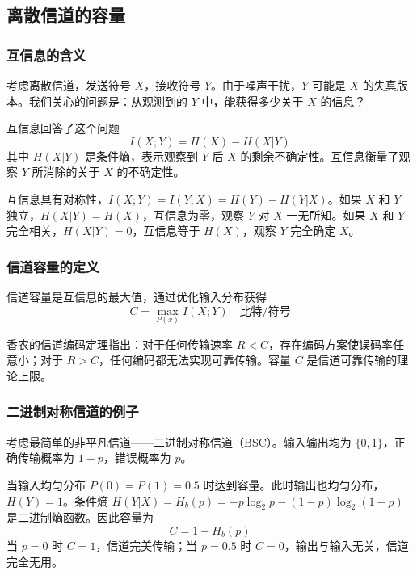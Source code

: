 \subsection{离散信道的容量}

\subsubsection{互信息的含义}

考虑离散信道，发送符号 $X$，接收符号 $Y$。由于噪声干扰，$Y$ 可能是 $X$ 的失真版本。我们关心的问题是：从观测到的 $Y$ 中，能获得多少关于 $X$ 的信息？

互信息回答了这个问题
\begin{equation}
    I(X;Y) = H(X) - H(X|Y)
\end{equation}
其中 $H(X|Y)$ 是条件熵，表示观察到 $Y$ 后 $X$ 的剩余不确定性。互信息衡量了观察 $Y$ 所消除的关于 $X$ 的不确定性。

互信息具有对称性，$I(X;Y) = I(Y;X) = H(Y) - H(Y|X)$。如果 $X$ 和 $Y$ 独立，$H(X|Y) = H(X)$，互信息为零，观察 $Y$ 对 $X$ 一无所知。如果 $X$ 和 $Y$ 完全相关，$H(X|Y) = 0$，互信息等于 $H(X)$，观察 $Y$ 完全确定 $X$。

\subsubsection{信道容量的定义}

信道容量是互信息的最大值，通过优化输入分布获得
\begin{equation}
    C = \max_{P(x)} I(X;Y) \quad \text{比特/符号}
\end{equation}

香农的信道编码定理指出：对于任何传输速率 $R < C$，存在编码方案使误码率任意小；对于 $R > C$，任何编码都无法实现可靠传输。容量 $C$ 是信道可靠传输的理论上限。

\subsubsection{二进制对称信道的例子}

考虑最简单的非平凡信道——二进制对称信道（BSC）。输入输出均为 $\{0,1\}$，正确传输概率为 $1-p$，错误概率为 $p$。

当输入均匀分布 $P(0)=P(1)=0.5$ 时达到容量。此时输出也均匀分布，$H(Y)=1$。条件熵 $H(Y|X) = H_b(p) = -p\log_2 p - (1-p)\log_2(1-p)$ 是二进制熵函数。因此容量为
\begin{equation}
    C = 1 - H_b(p)
\end{equation}
当 $p=0$ 时 $C=1$，信道完美传输；当 $p=0.5$ 时 $C=0$，输出与输入无关，信道完全无用。

